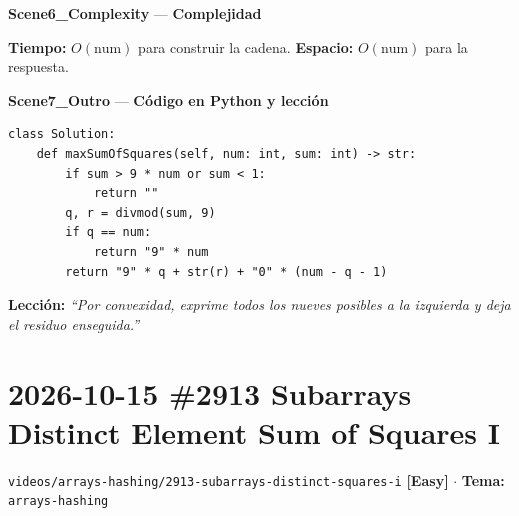 \documentclass[letterpaper,10pt]{article}
\newcommand{\scene}[2]{\noindent\textbf{\textcolor{mcaqua}{#1}} --- \textbf{#2}\par\vspace{1pt}}
\newcommand{\folder}[1]{\texttt{\textcolor{mcgreen}{#1}}}
\newcommand{\badge}[2]{\textbf{\textcolor{#1}{[#2]}}}
\begin{document}
\begin{shaded}
\scene{Scene6\_Complexity}{Complejidad}
\textbf{Tiempo:} $O(\text{num})$ para construir la cadena. \quad \textbf{Espacio:} $O(\text{num})$ para la respuesta.
\end{shaded}

\scene{Scene7\_Outro}{C\'odigo en Python y lecci\'on}
\begin{Verbatim}[frame=single,fontsize=\small]
class Solution:
    def maxSumOfSquares(self, num: int, sum: int) -> str:
        if sum > 9 * num or sum < 1:
            return ""
        q, r = divmod(sum, 9)
        if q == num:
            return "9" * num
        return "9" * q + str(r) + "0" * (num - q - 1)
\end{Verbatim}
\textbf{Lecci\'on:} \textit{``Por convexidad, exprime todos los nueves posibles a la izquierda y deja el residuo enseguida.''}

\newpage

\section{2026-10-15 \textbar{} \#2913 Subarrays Distinct Element Sum of Squares I}
\folder{videos/arrays-hashing/2913-subarrays-distinct-squares-i} \hfill \badge{mcgreen}{Easy} $\cdot$ \textbf{Tema:} \texttt{arrays-hashing}
\end{document}

